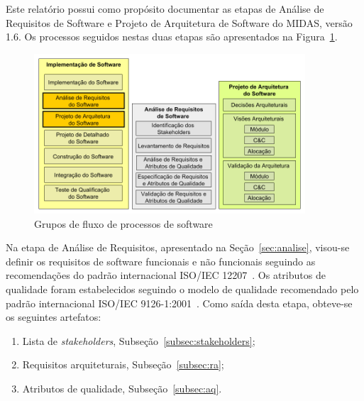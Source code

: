 \documentclass[11pt,a4paper]{article}
\begin{document}
Este relatório possui como propósito documentar as etapas de Análise de Requisitos de  Software e Projeto de Arquitetura de Software do MIDAS, versão 1.6. Os processos seguidos nestas duas etapas são apresentados na Figura~\ref{fig:visaogeral}. 
\begin{figure} [h!]
  \centering
    \includegraphics[width=0.9\textwidth]{visaogeral}
  \caption{Grupos de fluxo de processos de software}
  \label{fig:visaogeral}
\end{figure}

Na etapa de Análise de Requisitos, apresentado na Seção~\ref{sec:analise}, visou-se definir os requisitos de software funcionais e não funcionais seguindo as recomendações do padrão internacional ISO/IEC 12207~\cite{ISOIEC21207}. Os atributos de qualidade foram estabelecidos seguindo o modelo de qualidade recomendado pelo padrão internacional ISO/IEC 9126-1:2001~\cite{ISOIEC9126}. Como saída desta etapa, obteve-se os seguintes artefatos:

\begin{enumerate}
\item Lista de \textit{stakeholders}, Subseção~\ref{subsec:stakeholders};
\item Requisitos arquiteturais, Subseção~\ref{subsec:ra};
\item Atributos de qualidade, Subseção~\ref{subsec:aq}.
\end{enumerate}



\end{document}
